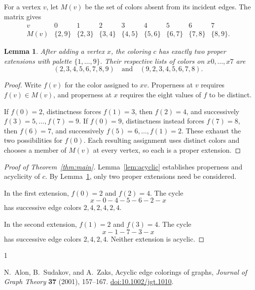 \documentclass[11pt]{article}
\newtheorem{lemma}{Lemma}
\begin{document}
For a vertex \(v\), let \(M(v)\) be the set of colors absent from
its incident edges. The matrix gives
\[
\begin{array}{c|cccccccc}
v&0&1&2&3&4&5&6&7\\ \hline
M(v)&\{2,9\}&\{2,3\}&\{3,4\}&\{4,5\}&
\{5,6\}&\{6,7\}&\{7,8\}&\{8,9\}.
\end{array}
\]

\begin{lemma}\label{lem:extensions}
After adding a vertex \(x\), the coloring \(c\) has exactly two
proper extensions with palette \(\{1,\ldots,9\}\).
Their respective lists of colors on \(x0,\ldots,x7\) are
\[
(2,3,4,5,6,7,8,9)
\quad\text{and}\quad
(9,2,3,4,5,6,7,8).
\]
\end{lemma}

\begin{proof}
Write \(f(v)\) for the color assigned to \(xv\).
Properness at \(v\) requires \(f(v)\in M(v)\), and properness at
\(x\) requires the eight values of \(f\) to be distinct.

If \(f(0)=2\), distinctness forces \(f(1)=3\), then \(f(2)=4\),
and successively \(f(3)=5,\ldots,f(7)=9\).
If \(f(0)=9\), distinctness instead forces \(f(7)=8\), then
\(f(6)=7\), and successively \(f(5)=6,\ldots,f(1)=2\).
These exhaust the two possibilities for \(f(0)\).
Each resulting assignment uses distinct colors and chooses a
member of \(M(v)\) at every vertex, so each is a proper extension.
\end{proof}

\begin{proof}[Proof of Theorem~\ref{thm:main}]
Lemma~\ref{lem:acyclic} establishes properness and acyclicity
of \(c\). By Lemma~\ref{lem:extensions}, only two proper extensions
need be considered.

In the first extension, \(f(0)=2\) and \(f(2)=4\).
The cycle
\[
x-0-4-5-6-2-x
\]
has successive edge colors \(2,4,2,4,2,4\).

In the second extension, \(f(1)=2\) and \(f(3)=4\).
The cycle
\[
x-1-7-3-x
\]
has successive edge colors \(2,4,2,4\).
Neither extension is acyclic.
\end{proof}

\begin{thebibliography}{1}

N.~Alon, B.~Sudakov, and A.~Zaks,
Acyclic edge colorings of graphs,
\emph{Journal of Graph Theory} \textbf{37} (2001), 157--167.
\href{https://doi.org/10.1002/jgt.1010}{doi:10.1002/jgt.1010}.

\end{thebibliography}
\end{document}
